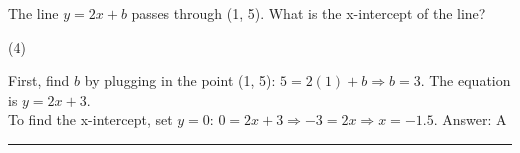 \documentclass[11pt,paper=a4,answers]{exam}
\begin{document}
\begin{questions}
\question
The line $y = 2x + b$ passes through (1, 5). What is the x-intercept of the line?
\begin{tasks}(4)
\end{tasks}

\begin{solution}
First, find $b$ by plugging in the point (1, 5): $5 = 2(1) + b \Rightarrow b = 3$. The equation is $y = 2x + 3$.
\\[10pt]
To find the x-intercept, set $y = 0$: $0 = 2x + 3 \Rightarrow -3 = 2x \Rightarrow x = -1.5$.
\vspace{15pt}
Answer: \colorbox{yellow!100}{A}
\end{solution}





\end{questions}
\begin{center}
\rule{.5\textwidth}{1pt}
\end{center}
\end{document}
